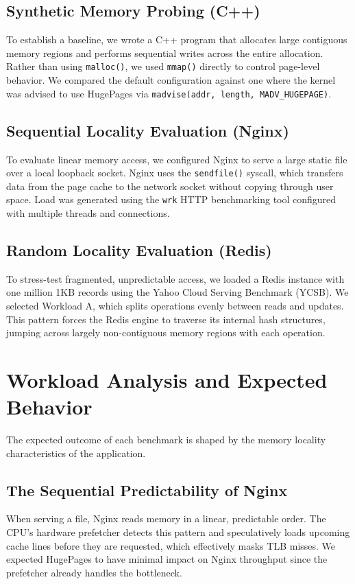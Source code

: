 \documentclass[conference]{IEEEtran}
\begin{document}
\subsection{Synthetic Memory Probing (C++)}
To establish a baseline, we wrote a C++ program that allocates large contiguous memory regions and performs sequential writes across the entire allocation. Rather than using \texttt{malloc()}, we used \texttt{mmap()} directly to control page-level behavior. We compared the default configuration against one where the kernel was advised to use HugePages via \texttt{madvise(addr, length, MADV\_HUGEPAGE)}.

\subsection{Sequential Locality Evaluation (Nginx)}
To evaluate linear memory access, we configured Nginx to serve a large static file over a local loopback socket. Nginx uses the \texttt{sendfile()} syscall, which transfers data from the page cache to the network socket without copying through user space. Load was generated using the \texttt{wrk} HTTP benchmarking tool configured with multiple threads and connections.

\subsection{Random Locality Evaluation (Redis)}
To stress-test fragmented, unpredictable access, we loaded a Redis instance with one million 1KB records using the Yahoo Cloud Serving Benchmark (YCSB). We selected Workload A, which splits operations evenly between reads and updates. This pattern forces the Redis engine to traverse its internal hash structures, jumping across largely non-contiguous memory regions with each operation.

\section{Workload Analysis and Expected Behavior}
The expected outcome of each benchmark is shaped by the memory locality characteristics of the application.

\subsection{The Sequential Predictability of Nginx}
When serving a file, Nginx reads memory in a linear, predictable order. The CPU's hardware prefetcher detects this pattern and speculatively loads upcoming cache lines before they are requested, which effectively masks TLB misses. We expected HugePages to have minimal impact on Nginx throughput since the prefetcher already handles the bottleneck.
\end{document}
